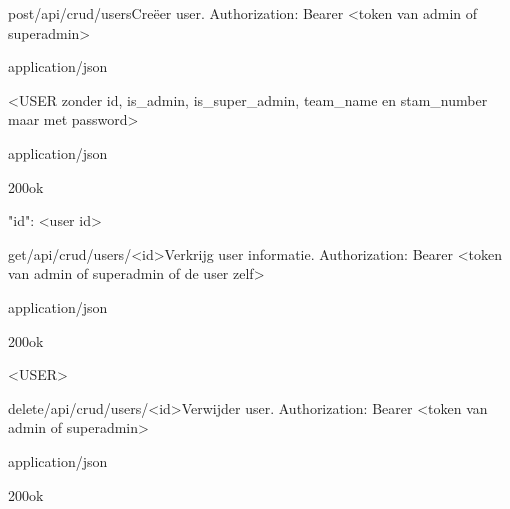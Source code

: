 \documentclass[10pt]{article}
\begin{document}
\begin{apiRoute}{post}{/api/crud/users}{Creëer user.}
 Authorization: Bearer <token van admin of superadmin>
	\begin{routeRequest}{application/json}
		\begin{routeRequestBody}
<USER zonder id, is_admin, is_super_admin, team_name en stam_number maar met password>
		\end{routeRequestBody}
	\end{routeRequest}

	\begin{routeResponse}{application/json}
		\begin{routeResponseItem}{200}{ok}
			\begin{routeResponseItemBody}
{
	"id": <user id>
}
			\end{routeResponseItemBody}
		\end{routeResponseItem}
	\end{routeResponse}
\end{apiRoute}

\begin{apiRoute}{get}{/api/crud/users/<id>}{Verkrijg user informatie.}
 Authorization: Bearer <token van admin of superadmin of de user zelf>
	\begin{routeParameter}
	\end{routeParameter}

	\begin{routeResponse}{application/json}
		\begin{routeResponseItem}{200}{ok}
			\begin{routeResponseItemBody}
<USER>
			\end{routeResponseItemBody}
		\end{routeResponseItem}
	\end{routeResponse}
\end{apiRoute}

\begin{apiRoute}{delete}{/api/crud/users/<id>}{Verwijder user.}
 Authorization: Bearer <token van admin of superadmin>
	\begin{routeParameter}
		\routeParamItem{id}{user id}
	\end{routeParameter}

	\begin{routeResponse}{application/json}
		\begin{routeResponseItem}{200}{ok}
			\begin{routeResponseItemBody}
			\end{routeResponseItemBody}
		\end{routeResponseItem}
	\end{routeResponse}
\end{apiRoute}
\end{document}
